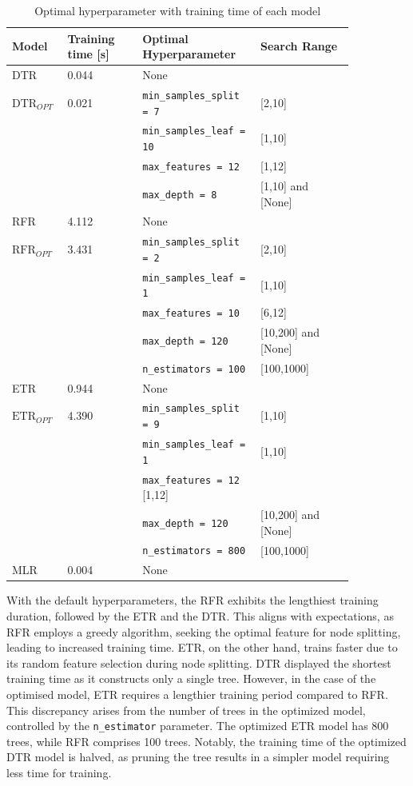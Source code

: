\begin{table}[h!]
    \footnotesize
    \centering
    {\begin{tabular}{ p{0.1\linewidth} p{0.2\linewidth}  p{0.3\linewidth} p{0.25\linewidth}}
    \hline
    Model & Training time [s] &  Optimal Hyperparameter & Search Range \\
    \hline
    DTR & 0.044 & None \\
    $\text{DTR}_{OPT}$ & 0.021  & {\tt min\_samples\_split = 7} & [2,10] \\
    &&{\tt min\_samples\_leaf = 10} & [1,10] \\
    &&{\tt max\_features = 12} & [1,12]\\
    &&{\tt max\_depth = 8} & [1,10] and [None]\\
    RFR & 4.112 & None \\
    $\text{RFR}_{OPT}$ & 3.431  & {\tt min\_samples\_split = 2} & [2,10]\\
    &&{\tt min\_samples\_leaf = 1} & [1,10]\\
    &&{\tt max\_features = 10} & [6,12]\\
    &&{\tt max\_depth = 120} & [10,200] and [None]\\
    &&{\tt n\_estimators = 100} & [100,1000]\\
    ETR & 0.944 & None \\
    $\text{ETR}_{OPT}$ & 4.390  & {\tt min\_samples\_split = 9} & [1,10]\\
    &&{\tt min\_samples\_leaf = 1} & [1,10]\\
    &&{\tt max\_features = 12} [1,12]\\
    &&{\tt max\_depth = 120} & [10,200] and [None]\\
    &&{\tt n\_estimators = 800} & [100,1000]\\
    MLR & 0.004  & None\\
    \hline
    \end{tabular}}
\caption{Optimal hyperparameter with training time of each model}\label{tbl:hpo_optimal}
\end{table}

With the default hyperparameters, the RFR exhibits the lengthiest training duration, followed by the ETR and the DTR. This aligns with expectations, as RFR employs a greedy algorithm, seeking the optimal feature for node splitting, leading to increased training time. ETR, on the other hand, trains faster due to its random feature selection during node splitting. DTR displayed the shortest training time as it constructs only a single tree. However, in the case of the optimised model, ETR requires a lengthier training period compared to RFR. This discrepancy arises from the number of trees in the optimized model, controlled by the {\tt n\_estimator} parameter. The optimized ETR model has 800 trees, while RFR comprises 100 trees. Notably, the training time of the optimized DTR model is halved, as pruning the tree results in a simpler model requiring less time for training.\\

